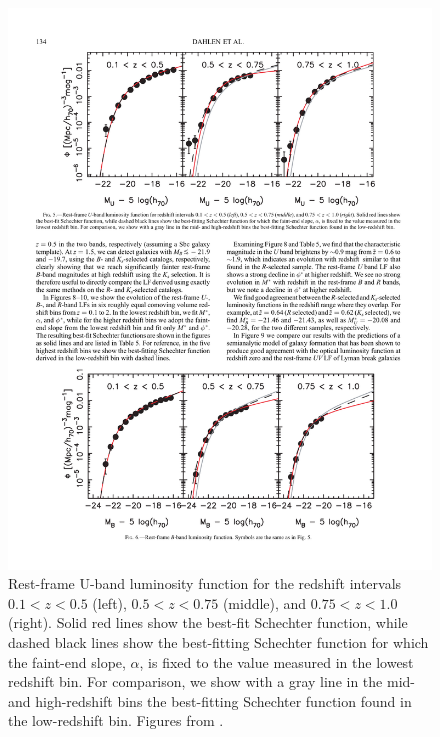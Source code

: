 \begin{figure}
\centering
\includegraphics[width=130mm]{./plots/LF_redshift.pdf}
\caption{Rest-frame U-band luminosity function for the redshift intervals $0.1 < z < 0.5$ (left), $0.5 < z < 0.75$ (middle), and $0.75 < z < 1.0$ (right). Solid red lines show the best-fit Schechter function, while dashed black lines show the best-fitting Schechter function for which the faint-end slope, $\alpha$, is fixed to the value measured in the lowest redshift bin. For comparison, we show with a gray line in the mid- and high-redshift bins the best-fitting Schechter function found in the low-redshift bin. Figures from \citet{Dahlen2005}.}
\label{fig:LF_redshift}
\end{figure}

